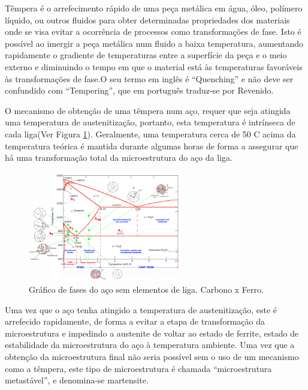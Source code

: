 Têmpera é o arrefecimento rápido de uma peça metálica em água, óleo, polímero líquido, ou outros fluidos para obter determinadas propriedades dos materiais onde se visa evitar a ocorrência de processos como transformações de fase. Isto é possível ao imergir a peça metálica num fluido a baixa temperatura, aumentando rapidamente o gradiente de temperaturas entre a superfície da peça e o meio externo e diminuindo o tempo em que o material está às temperaturas favoráveis às transformações de fase\cite{Chaus2006}.O seu termo em inglês é “Quenching” e não deve ser confundido com “Tempering”, que em português traduz-se por Revenido.
\par
O mecanismo de obtenção de uma têmpera num aço, requer que seja atingida uma temperatura de austenitização, portanto, esta temperatura é intrínseca de cada liga(Ver Figura \ref{fig:Iron_Carbon_Diagram}). Geralmente, uma temperatura cerca de 50 \textdegree C acima da temperatura teórica é mantida durante algumas horas de forma a assegurar que há uma transformação total da microestrutura do aço da liga.
\begin{figure}[htb]
    \centering
    \includegraphics[width = 0.6\textwidth]{Figures/Cap2/Iron_Carbon_Diagram.png}
    \caption[Gráfico de fases do aço. Carbono x Ferro]%
    {Gráfico de fases do aço sem elementos de liga. Carbono x Ferro\cite{FollSD}. }
    \label{fig:Iron_Carbon_Diagram}
\end{figure}
\par
Uma vez que o aço tenha atingido a temperatura de austenitização, este é arrefecido rapidamente, de forma a evitar a etapa de transformação da microestrutura e impedindo a austenite de voltar ao estado de ferrite, estado de estabilidade da microestrutura do aço à temperatura ambiente. Uma vez que a obtenção da microestrutura final não seria possível sem o uso de um mecanismo como a têmpera, este tipo de microestrutura é chamada “microestrutura metastável”, e denomina-se martensite.
